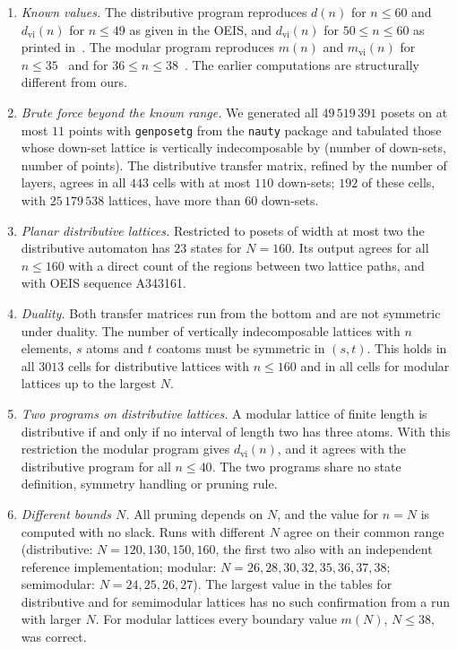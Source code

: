 \documentclass[11pt]{amsart}
\theoremstyle{definition}
\theoremstyle{remark}
\begin{document}
\begin{enumerate}
\item \emph{Known values.}  The distributive program reproduces $d(n)$ for $n \le 60$
and $d_{\mathrm{vi}}(n)$ for $n \le 49$ as given in the OEIS, and $d_{\mathrm{vi}}(n)$
for $50 \le n \le 60$ as printed in~\cite[Table~2]{Koh21}.  The modular
program reproduces $m(n)$ and $m_{\mathrm{vi}}(n)$ for $n \le 35$~\cite{Koh21} and for
$36 \le n \le 38$~\cite{Koh23}.  The earlier
computations are structurally different from ours.
\item \emph{Brute force beyond the known range.}  We generated all $49\,519\,391$ posets on at
most $11$ points with \texttt{genposetg} from the \texttt{nauty} package and tabulated those whose down-set lattice
is vertically indecomposable by (number of down-sets, number of points).  The
distributive transfer matrix, refined by the number of layers, agrees in all $443$ cells
with at most $110$ down-sets; $192$ of these cells, with $25\,179\,538$ lattices, have
more than $60$ down-sets.
\item \emph{Planar distributive lattices.}  Restricted to posets of width at most two the
distributive automaton has $23$ states for $N = 160$.  Its output agrees for all
$n \le 160$ with a direct count of the regions between two lattice paths, and with
OEIS sequence A343161.
\item \emph{Duality.}  Both transfer matrices run from the bottom and are not symmetric
under duality.  The number of vertically indecomposable lattices with $n$ elements, $s$
atoms and $t$ coatoms must be symmetric in $(s,t)$.  This holds in all $3013$ cells for
distributive lattices with $n \le 160$ and in all cells for modular lattices up to the
largest $N$.
\item \emph{Two programs on distributive lattices.}  A modular lattice of finite length
is distributive if and only if no interval of length two has three atoms.  With this
restriction the modular program gives $d_{\mathrm{vi}}(n)$, and it agrees with the
distributive program for all $n \le 40$.  The two programs share no state definition,
symmetry handling or pruning rule.
\item \emph{Different bounds $N$.}  All pruning depends on $N$, and the value for
$n = N$ is computed with no slack.  Runs with different $N$ agree on their common range
(distributive: $N = 120, 130, 150, 160$, the first two also with an independent reference
implementation; modular: $N = 26, 28, 30, 32, 35, 36, 37, 38$; semimodular: $N = 24, 25, 26, 27$).  The largest
value in the tables for distributive and for semimodular lattices has no such confirmation from
a run with larger $N$.  For modular lattices every boundary value $m(N)$, $N \le 38$, was
correct.
\end{enumerate}
\end{document}
